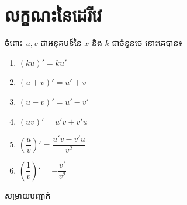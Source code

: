 \documentclass[12pt,fleqn]{book} %
\newcommand{\solution}{{\begin{center}\kml \color{blue} សម្រាយបញ្ជាក់\end{center} }}
\begin{document}
 \section{លក្ខណះនៃដេរីវេ}
 \begin{property}
 ចំពោះ $u,v$ ជាអនុគមន៍នៃ $x$ និង $k$ ជាចំនួនថេ នោះគេបាន៖
 \begin{multicols}{3}
 \begin{enumerate}
 \item $(ku)'=ku'$
 \item $(u+ v)'=u'+ v$
 \item $(u-v)'=u'-v'$
 \item $(uv)'=u'v+v'u$
 \item $\left(\dfrac{u}{v}\right)'=\dfrac{u'v-v'u}{v^2}$
 \item $\left(\dfrac{1}{v}\right)'=-\dfrac{v'}{v^2}$
 \end{enumerate}
 \end{multicols}
 \end{property}
 \solution 
\end{document}
